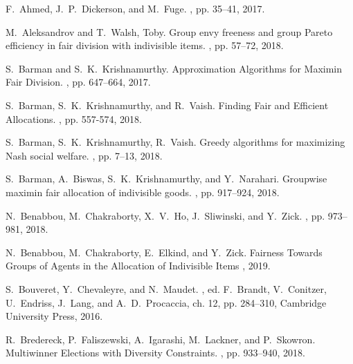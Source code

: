 \documentclass[11pt,dvipdfmx]{article}
\begin{document}
\begin{thebibliography}{10} 
	\itemsep=1pt 
	\begin{small}
		
		 F.~Ahmed, J.~P.~Dickerson, and M.~Fuge.  , pp. 35--41, 2017.
		
		 M.~Aleksandrov and T.~Walsh, Toby. \newblock Group envy freeness and group Pareto efficiency in fair division with indivisible items. , pp. 57--72, 2018.
		
		 S.~Barman and S.~K.~Krishnamurthy. \newblock Approximation Algorithms for Maximin Fair Division. , pp. 647--664, 2017.
	
		 S.~Barman, S.~K.~Krishnamurthy, and R.~Vaish. \newblock Finding Fair and Efficient Allocations. , pp. 557-574, 2018.
	
		 S.~Barman, S.~K.~Krishnamurthy, R.~Vaish. \newblock Greedy algorithms for maximizing {N}ash social welfare. , pp. 7--13, 2018.
	
		 S.~Barman, A.~Biswas, S.~K.~Krishnamurthy, and Y.~Narahari. \newblock Groupwise maximin fair allocation of indivisible goods. , pp. 917--924, 2018.
	
		 N.~Benabbou, M.~Chakraborty, X.~V.~Ho, J.~Sliwinski, and Y.~Zick.  , pp. 973--981, 2018.
	
		 N.~Benabbou, M.~Chakraborty, E.~Elkind, and Y.~Zick. \newblock Fairness Towards Groups of Agents in the Allocation of Indivisible Items , 2019.
	
		 S.~Bouveret, Y.~Chevaleyre, and N.~Maudet.  , ed. F.~Brandt, V.~Conitzer, U.~Endriss, J.~Lang, and A.~D.~Procaccia, ch. 12, pp. 284--310, {Cambridge University Press}, 2016.
	
		 R.~Bredereck, P.~Faliszewski, A.~Igarashi, M.~Lackner, and P.~Skowron. \newblock Multiwinner Elections with Diversity Constraints. , pp. 933--940, 2018.
	

\end{small}
\end{thebibliography}
\end{document}
